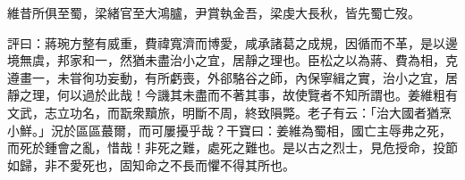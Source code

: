 \begin{pinyinscope}
維昔所俱至蜀，梁緒官至大鴻臚，尹賞執金吾，梁虔大長秋，皆先蜀亡歿。

評曰：蔣琬方整有威重，費禕寬濟而博愛，咸承諸葛之成規，因循而不革，是以邊境無虞，邦家和一，然猶未盡治小之宜，居靜之理也。臣松之以為蔣、費為相，克遵畫一，未甞徇功妄動，有所虧喪，外郤駱谷之師，內保寧緝之實，治小之宜，居靜之理，何以過於此哉！今譏其未盡而不著其事，故使覽者不知所謂也。姜維粗有文武，志立功名，而翫衆黷旅，明斷不周，終致隕斃。老子有云：「治大國者猶烹小鮮。」況於區區蕞爾，而可屢擾乎哉？干寶曰：姜維為蜀相，國亡主辱弗之死，而死於鍾會之亂，惜哉！非死之難，處死之難也。是以古之烈士，見危授命，投節如歸，非不愛死也，固知命之不長而懼不得其所也。


\end{pinyinscope}